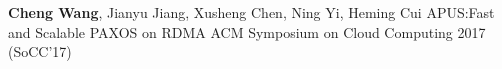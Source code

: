 \cvpub
{\textbf{Cheng Wang}, Jianyu Jiang, Xusheng Chen, Ning Yi, Heming Cui} %
{APUS:Fast and Scalable PAXOS on RDMA} %
{} %
{} %
{ %
ACM Symposium on Cloud Computing 2017 (SoCC'17)\newline
}
